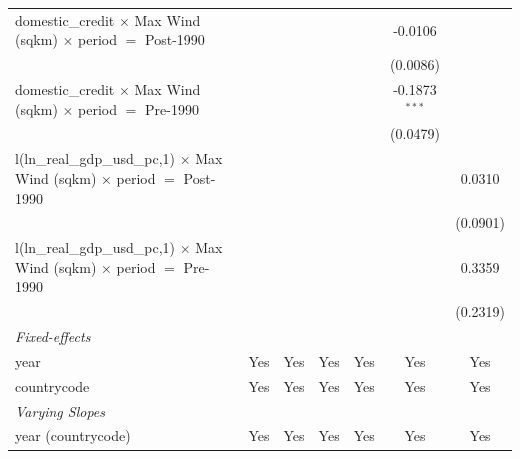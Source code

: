 \begin{tabular}{lcccccc}
   domestic\_credit $\times$ Max Wind (sqkm) $\times$ period $=$ Post-1990                   &             &                         &                 &          & -0.0106                 &   \\   
                                                                                             &             &                         &                 &          & (0.0086)                &   \\   
   domestic\_credit $\times$ Max Wind (sqkm) $\times$ period $=$ Pre-1990                    &             &                         &                 &          & -0.1873$^{***}$         &   \\   
                                                                                             &             &                         &                 &          & (0.0479)                &   \\   
   l(ln\_real\_gdp\_usd\_pc,1) $\times$ Max Wind (sqkm) $\times$ period $=$ Post-1990        &             &                         &                 &          &                         & 0.0310\\   
                                                                                             &             &                         &                 &          &                         & (0.0901)\\   
   l(ln\_real\_gdp\_usd\_pc,1) $\times$ Max Wind (sqkm) $\times$ period $=$ Pre-1990         &             &                         &                 &          &                         & 0.3359\\   
                                                                                             &             &                         &                 &          &                         & (0.2319)\\   
   \midrule
   \emph{Fixed-effects}\\
   year                                                                                      & Yes         & Yes                     & Yes             & Yes      & Yes                     & Yes\\  
   countrycode                                                                               & Yes         & Yes                     & Yes             & Yes      & Yes                     & Yes\\  
   \midrule
   \emph{Varying Slopes}\\
   year (countrycode)                                                                        & Yes         & Yes                     & Yes             & Yes      & Yes                     & Yes\\  

\end{tabular}
